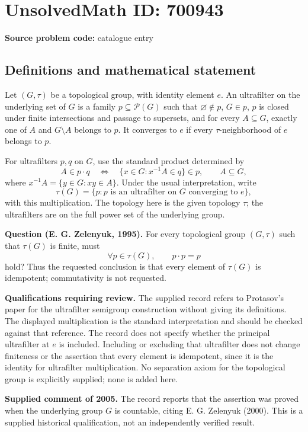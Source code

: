 \documentclass[11pt]{article}
\begin{document}
\section*{UnsolvedMath ID: 700943}
\textbf{Source problem code:} catalogue entry
\subsection{Definitions and mathematical statement}
Let \((G,\tau)\) be a topological group, with identity element \(e\). An ultrafilter on the underlying set of \(G\) is a family \(p\subseteq\mathcal P(G)\) such that \(\varnothing\notin p\), \(G\in p\), \(p\) is closed under finite intersections and passage to supersets, and for every \(A\subseteq G\), exactly one of \(A\) and \(G\setminus A\) belongs to \(p\). It converges to \(e\) if every \(\tau\)-neighborhood of \(e\) belongs to \(p\).

For ultrafilters \(p,q\) on \(G\), use the standard product determined by
\[
 A\in p\cdot q
 \quad\Longleftrightarrow\quad
 \{x\in G:x^{-1}A\in q\}\in p,
 \qquad A\subseteq G,
\]
where \(x^{-1}A=\{y\in G:xy\in A\}\). Under the usual interpretation, write
\[
 \tau(G)=\{p:p\text{ is an ultrafilter on }G\text{ converging to }e\},
\]
with this multiplication. The topology here is the given topology \(\tau\); the ultrafilters are on the full power set of the underlying group.

\textbf{Question (E. G. Zelenyuk, 1995).} For every topological group \((G,\tau)\) such that \(\tau(G)\) is finite, must
\[
 \forall p\in\tau(G),\qquad p\cdot p=p
\]
hold? Thus the requested conclusion is that every element of \(\tau(G)\) is idempotent; commutativity is not requested.

\textbf{Qualifications requiring review.} The supplied record refers to Protasov's paper for the ultrafilter semigroup construction without giving its definitions. The displayed multiplication is the standard interpretation and should be checked against that reference. The record does not specify whether the principal ultrafilter at \(e\) is included. Including or excluding that ultrafilter does not change finiteness or the assertion that every element is idempotent, since it is the identity for ultrafilter multiplication. No separation axiom for the topological group is explicitly supplied; none is added here.

\textbf{Supplied comment of 2005.} The record reports that the assertion was proved when the underlying group \(G\) is countable, citing E. G. Zelenyuk (2000). This is a supplied historical qualification, not an independently verified result.
\end{document}
